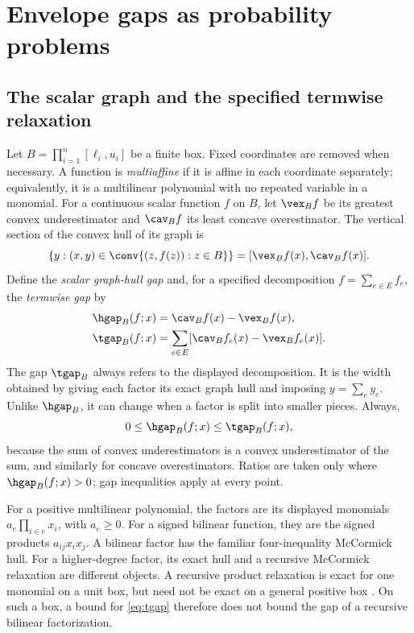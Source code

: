 \section{Envelope gaps as probability problems}\label{sec:foundations}
\subsection{The scalar graph and the specified termwise relaxation}
Let $B=\prod_{i=1}^n[\ell_i,u_i]$ be a finite box. Fixed coordinates are
removed when necessary. A function is \emph{multiaffine} if it is affine in
each coordinate separately; equivalently, it is a multilinear polynomial
with no repeated variable in a monomial. For a continuous scalar function
$f$ on $B$, let $\vex_B f$ be its greatest convex underestimator and
$\cav_B f$ its least concave overestimator. The vertical section of the
convex hull of its graph is
\[
 \{y:(x,y)\in\conv\{(z,f(z)):z\in B\}\}
 =[\vex_B f(x),\cav_B f(x)].
\]
Define the \emph{scalar graph-hull gap} and, for a specified decomposition
$f=\sum_{e\in E}f_e$, the \emph{termwise gap} by
\begin{align}
 \hgap_B(f;x)&=\cav_B f(x)-\vex_B f(x),\label{eq:hgap}\\
 \tgap_B(f;x)&=\sum_{e\in E}
 [\cav_B f_e(x)-\vex_B f_e(x)].\label{eq:tgap}
\end{align}
The gap $\tgap_B$ always refers to the displayed decomposition. It is the
width obtained by giving each factor its exact graph hull and imposing
$y=\sum_e y_e$. Unlike $\hgap_B$, it can change when a factor is split into
smaller pieces. Always,
\begin{equation}\label{eq:gap-order}
 0\le\hgap_B(f;x)\le\tgap_B(f;x),
\end{equation}
because the sum of convex underestimators is a convex underestimator of
the sum, and similarly for concave overestimators. Ratios are taken only
where $\hgap_B(f;x)>0$; gap inequalities apply at every point.

For a positive multilinear polynomial, the factors are its displayed
monomials $a_e\prod_{i\in e}x_i$, with $a_e\ge0$. For a signed bilinear
function, they are the signed products $a_{ij}x_ix_j$. A bilinear factor
has the familiar four-inequality McCormick hull. For a higher-degree factor,
its exact hull and a recursive McCormick relaxation are different objects.
A recursive product relaxation is exact for one monomial on a unit box,
but need not be exact on a general positive box
\citep[Sections 2--3]{Luedtke2012}. On such a box, a bound for
\eqref{eq:tgap} therefore does not bound the
gap of a recursive bilinear factorization.

